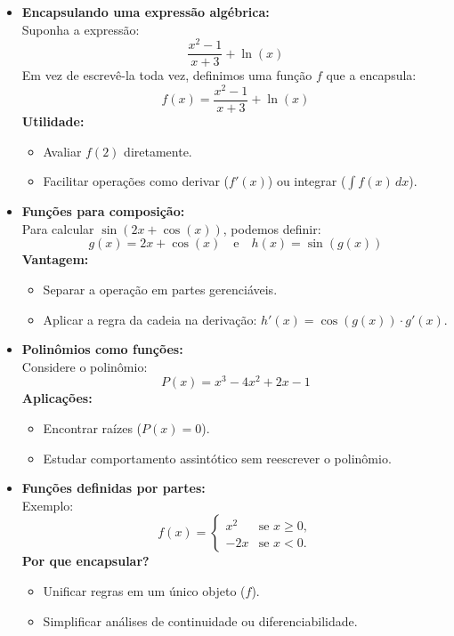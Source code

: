\documentclass{article}
\begin{document}
\begin{itemize}
    \item \textbf{Encapsulando uma expressão algébrica:} \\
    Suponha a expressão:
    \[
    \frac{x^2 - 1}{x + 3} + \ln(x)
    \]
    Em vez de escrevê-la toda vez, definimos uma função \( f \) que a encapsula:
    \[
    f(x) = \frac{x^2 - 1}{x + 3} + \ln(x)
    \]
    \textbf{Utilidade:}
    \begin{itemize}
        \item Avaliar \( f(2) \) diretamente.
        \item Facilitar operações como derivar (\( f'(x) \)) ou integrar (\( \int f(x) \, dx \)).
    \end{itemize}

    \item \textbf{Funções para composição:} \\
    Para calcular \( \sin(2x + \cos(x)) \), podemos definir:
    \[
    g(x) = 2x + \cos(x) \quad \text{e} \quad h(x) = \sin(g(x))
    \]
    \textbf{Vantagem:}
    \begin{itemize}
        \item Separar a operação em partes gerenciáveis.
        \item Aplicar a regra da cadeia na derivação: \( h'(x) = \cos(g(x)) \cdot g'(x) \).
    \end{itemize}

    \item \textbf{Polinômios como funções:} \\
    Considere o polinômio:
    \[
    P(x) = x^3 - 4x^2 + 2x - 1
    \]
    \textbf{Aplicações:}
    \begin{itemize}
        \item Encontrar raízes (\( P(x) = 0 \)).
        \item Estudar comportamento assintótico sem reescrever o polinômio.
    \end{itemize}

    \item \textbf{Funções definidas por partes:} \\
    Exemplo:
    \[
    f(x) = 
    \begin{cases} 
    x^2 & \text{se } x \geq 0, \\
    -2x & \text{se } x < 0.
    \end{cases}
    \]
    \textbf{Por que encapsular?}
    \begin{itemize}
        \item Unificar regras em um único objeto (\( f \)).
        \item Simplificar análises de continuidade ou diferenciabilidade.
    \end{itemize}


\end{itemize}
\end{document}
